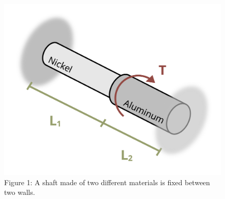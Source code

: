 \documentclass[
  letterpaper,
  DIV=11,
  numbers=noendperiod]{scrreprt}
\begin{document}
\begin{figure}[H]

{\centering \includegraphics{images/292.png}

}

\caption{Figure 1: A shaft made of two different materials is fixed
between two walls.}

\end{figure}%
\end{document}
